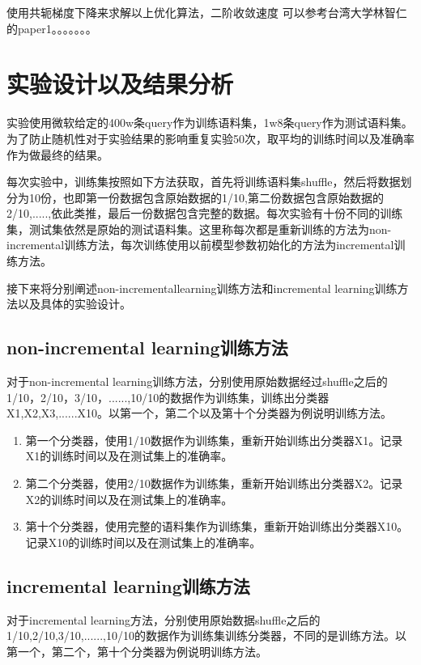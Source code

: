 \documentclass[master]{njuthesis}
\begin{document}
\begin{enumerate}
\begin{enumerate}
\begin{enumerate}
使用共轭梯度下降来求解以上优化算法，二阶收敛速度
可以参考台湾大学林智仁的paper1。。。。。。。

\section{实验设计以及结果分析}

    实验使用微软给定的400w条query作为训练语料集，1w8条query作为测试语料集。为了防止随机性对于实验结果的影响重复实验50次，取平均的训练时间以及准确率作为做最终的结果。

    每次实验中，训练集按照如下方法获取，首先将训练语料集shuffle，然后将数据划分为10份，也即第一份数据包含原始数据的1/10,第二份数据包含原始数据的2/10,.....,依此类推，最后一份数据包含完整的数据。每次实验有十份不同的训练集，测试集依然是原始的测试语料集。这里称每次都是重新训练的方法为non-incremental训练方法，每次训练使用以前模型参数初始化的方法为incremental训练方法。
    
    接下来将分别阐述non-incrementallearning训练方法和incremental learning训练方法以及具体的实验设计。

\subsection{non-incremental learning训练方法}

    对于non-incremental learning训练方法，分别使用原始数据经过shuffle之后的1/10，2/10，3/10，......,10/10的数据作为训练集，训练出分类器X1,X2,X3,......X10。以第一个，第二个以及第十个分类器为例说明训练方法。
    
    \begin{enumerate}
      \item 第一个分类器，使用1/10数据作为训练集，重新开始训练出分类器X1。记录X1的训练时间以及在测试集上的准确率。
      \item 第二个分类器，使用2/10数据作为训练集，重新开始训练出分类器X2。记录X2的训练时间以及在测试集上的准确率。
      \item 第十个分类器，使用完整的语料集作为训练集，重新开始训练出分类器X10。记录X10的训练时间以及在测试集上的准确率。
    \end{enumerate}

\subsection{incremental learning训练方法}
    
   对于incremental learning方法，分别使用原始数据shuffle之后的1/10,2/10,3/10,......,10/10的数据作为训练集训练分类器，不同的是训练方法。以第一个，第二个，第十个分类器为例说明训练方法。


\end{enumerate}
\end{enumerate}
\end{enumerate}
\end{document}
